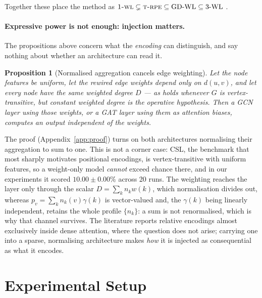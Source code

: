 \documentclass[11pt]{article}
\newtheorem{proposition}{Proposition}
\newcommand{\WL}{\textsc{1-wl}}
\newcommand{\TRPE}{\textsc{t-rpe}}
\begin{document}
Together these place the method as
$\WL\subsetneq\TRPE\subseteq\text{GD-WL}\subseteq\text{3-WL}$
\citep{zhang2023biconnectivity}.

\paragraph{Expressive power is not enough: injection matters.}
The propositions above concern what the \emph{encoding} can distinguish, and say nothing about
whether an architecture can read it.

\begin{proposition}[Normalised aggregation cancels edge weighting]\label{prop:cancel}
Let the node features be uniform, let the rewired edge weights depend only on $d(u,v)$, and let
every node have the same weighted degree $D$ --- as holds whenever $G$ is vertex-transitive, but
constant weighted degree is the operative hypothesis. Then a GCN layer using those weights, or a
GAT layer using them as attention biases, computes an output independent of the weights.
\end{proposition}

The proof (Appendix~\ref{app:proof}) turns on both architectures normalising their aggregation to
sum to one. This is not a corner case: CSL, the benchmark that most sharply motivates positional
encodings, is vertex-transitive with uniform features, so a weight-only model \emph{cannot}
exceed chance there, and in our experiments it scored $10.00\pm0.00\%$ across 20 runs. The
weighting reaches the layer only through the scalar $D=\sum_k n_k w(k)$, which normalisation
divides out, whereas $p_v=\sum_k n_k(v)\gamma(k)$ is vector-valued and, the $\gamma(k)$ being
linearly independent, retains the whole profile $\{n_k\}$: a sum is not renormalised, which is
why that channel survives. The literature reports relative encodings almost exclusively
inside dense attention, where the question does not arise; carrying one into a sparse,
normalising architecture makes \emph{how} it is injected as consequential as what it encodes.

\section{Experimental Setup}
\label{sec:setup}
\end{document}
